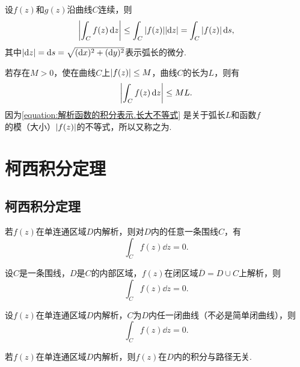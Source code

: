 \begin{theorem}
设\(f(z)\)和\(g(z)\)沿曲线\(C\)连续，则\[
\abs{\int_C f(z) \dd{z}}
\leq \int_C{\abs{f(z)}\abs{\dd{z}}}
= \int_C{\abs{f(z)}\dd{s}},
\]其中\(\abs{\dd{z}}=\dd{s}=\sqrt{(\dd{x})^2+(\dd{y})^2}\)表示弧长的微分.
\end{theorem}

\begin{corollary}[积分估值定理]\label{theorem:解析函数的积分表示.积分估值定理}
若存在\(M > 0\)，使在曲线\(C\)上\(\abs{f(z)} \leq M\)，曲线\(C\)的长为\(L\)，则有\begin{equation}\label{equation:解析函数的积分表示.长大不等式}
\abs{\int_C f(z) \dd{z}} \leq ML.
\end{equation}\rm
因为\cref{equation:解析函数的积分表示.长大不等式} 是关于弧长\(L\)和函数\(f\)的模（大小）\(\abs{f(z)}\)的不等式，所以又称之为.
\end{corollary}

\section{柯西积分定理}
\subsection{柯西积分定理}
\begin{theorem}[柯西积分定理]\label{theorem:解析函数的积分表示.柯西积分定理}
若\(f(z)\)在单连通区域\(D\)内解析，则对\(D\)内的任意一条围线\(C\)，有\[
\int_C f(z) \dd{z}=0.
\]
\end{theorem}

\begin{theorem}\label{theorem:解析函数的积分表示.柯西积分定理.闭区域的情形}
设\(C\)是一条围线，\(D\)是\(C\)的内部区域，\(f(z)\)在闭区域\(\overline{D}=D \cup C\)上解析，则\[
\int_C f(z) \dd{z}=0.
\]
\end{theorem}

\begin{corollary}\label{theorem:解析函数的积分表示.柯西积分定理.非简单闭曲线的情形}
设\(f(z)\)在单连通区域\(D\)内解析，\(C\)为\(D\)内任一闭曲线（不必是简单闭曲线），则\[
\int_C f(z) \dd{z} = 0.
\]
\end{corollary}

\begin{corollary}\label{theorem:解析函数的积分表示.解析函数在解析区域内的积分与路径无关}
若\(f(z)\)在单连通区域\(D\)内解析，则\(f(z)\)在\(D\)内的积分与路径无关.
\end{corollary}

